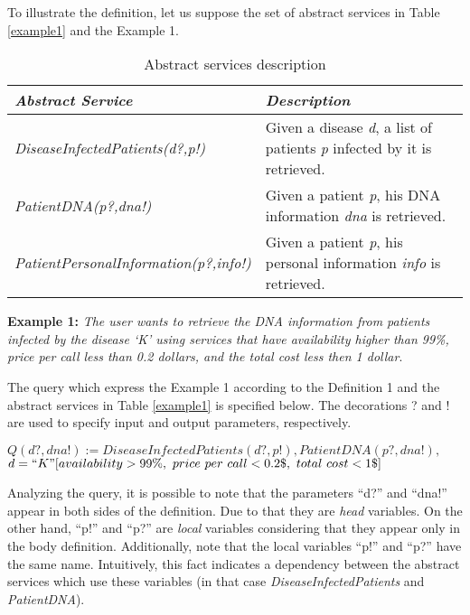 To illustrate the definition, let us suppose the set of abstract services in Table \ref{example1} and the Example 1.

\begin{table}[h]
\center
\begin{tabular}{|p{7cm}|p{7cm}|}
\hline 
\textbf{\textit{Abstract Service}} & \textbf{\textit{Description}} \\ 
\hline 
\textit{DiseaseInfectedPatients(d?,p!)} & Given a disease \textit{d}, a list of patients \textit{p} infected by it is retrieved. \\ 
\hline 
\textit{PatientDNA(p?,dna!)} & Given a patient \textit{p}, his DNA information \textit{dna} is retrieved. \\ 
\hline 
\textit{PatientPersonalInformation(p?,info!)} & Given a patient \textit{p}, his personal information \textit{info} is retrieved. \\ 
\hline 
\end{tabular} \caption{Abstract services description}
\end{table}\label{example1}


\noindent \textbf{Example 1:} %
\textit{The user wants to retrieve the DNA information from patients infected by the disease `K' using services that have availability higher than 99\%, price per call less than 0.2 dollars, and the total cost less then 1 dollar}.

The query which express the Example 1 according to the Definition 1 and the abstract services in Table \ref{example1} is specified below.
The decorations ? and ! are used to specify input and output parameters, respectively. 

\begin{center}
$Q (d?, dna!) := DiseaseInfectedPatients(d?, p!), PatientDNA(p?, dna!),$ \\
$d = ``K"[availability > 99\%, \ price \ per \ call < 0.2\$, \ total \ cost < 1\$]$
\end{center}  

Analyzing the query, it is possible to note that the parameters ``d?'' and ``dna!'' appear in both sides of the definition.
Due to that they are \textit{head} variables.
On the other hand, ``p!'' and ``p?'' are \textit{local} variables considering that they appear only in the body definition. 
Additionally, note that the local variables ``p!'' and ``p?'' have the same name.
Intuitively, this fact indicates a dependency between the abstract services which use these variables (in that case \textit{DiseaseInfectedPatients} and \textit{PatientDNA}).

